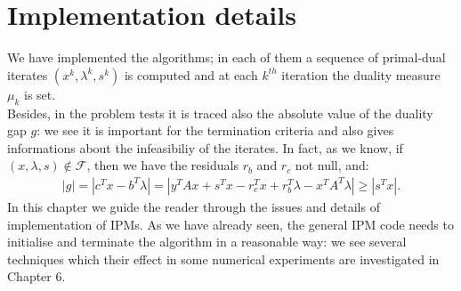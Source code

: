 \documentclass[a4paper,10 pt,titlepage,twoside]{book}
\theoremstyle{plain}
\theoremstyle{definition}
\theoremstyle{remark}
\begin{document}
{{%

\chapter{Implementation details}
We have implemented the algorithms; in each of them a sequence of primal-dual iterates $(x^{k},\lambda^{k},s^{k})$ is computed and at each $k^{th}$ iteration the duality measure $\mu_{k}$ is set.\\
Besides, in the problem tests it is traced also the absolute value of the duality gap $g$: we see it is important for the termination criteria and also gives informations about the infeasibiliy of the iterates. In fact, as we know, if $(x,\lambda,s) \notin \mathcal{F}$, then we have the residuals $r_{b}$ and $r_{c}$ not null, and: 
\begin{align*}
|g|=|c^{T}x-b^{T}\lambda|=|y^{T}Ax+s^{T}x-r_{c}^{T}x+r_{b}^{T}\lambda-x^{T}A^{T}\lambda|\geq |s^{T}x|.
\end{align*}
In this chapter we guide the reader through the issues and details of implementation of IPMs. As we have already seen, the general IPM code needs to initialise and terminate the algorithm in a reasonable way: we see several techniques which their effect in some numerical experiments are investigated in Chapter 6.  
}}
\end{document}
